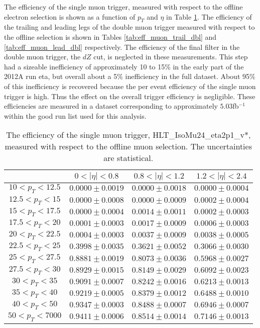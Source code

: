 %
%

The efficiency of the single muon trigger, measured
with respect to the offline electron selection is shown
as a function of $p_T$ and $\eta$ in Table \ref{tab:eff_muon_sgl}.
The efficiency of the trailing and leading legs of the double muon trigger
measured with respect to the offline selection is shown
in Tables \ref{tab:eff_muon_trail_dbl} and \ref{tab:eff_muon_lead_dbl} respectively.
The efficiency of the final filter in the double muon trigger, the $dZ$ cut,
is neglected in these measurements.  This step had a sizeable inefficiency of
approximately 10 to 15\% in the early part of the 2012A run eta, but
overall about a 5\% inefficiency in the full dataset.
About 95\% of this inefficiency is recovered
because the per event efficiency of the single muon trigger is high.
Thus the effect on the overall trigger efficiency is negligible.
These efficiencies are measured in a dataset corresponding
to approximately $5.03$fb$^{-1}$ within the good run list used for this analysis.

\begin{table}[!ht]
\begin{center}
\begin{tabular}{c|c|c|c}
\hline & $0 < |\eta| < 0.8$ & $0.8 < |\eta| < 1.2$ & $1.2 < |\eta| < 2.4$  \\
\hline
$ 10 < p_T < 12.5$ & $0.0000 \pm 0.0019$ & $0.0000 \pm 0.0018$ & $0.0000 \pm 0.0004$  \\
$12.5 < p_T <  15$ & $0.0000 \pm 0.0008$ & $0.0000 \pm 0.0009$ & $0.0002 \pm 0.0004$  \\
$ 15 < p_T < 17.5$ & $0.0000 \pm 0.0004$ & $0.0014 \pm 0.0011$ & $0.0002 \pm 0.0003$  \\
$17.5 < p_T <  20$ & $0.0001 \pm 0.0003$ & $0.0017 \pm 0.0009$ & $0.0006 \pm 0.0003$  \\
$ 20 < p_T < 22.5$ & $0.0004 \pm 0.0003$ & $0.0037 \pm 0.0009$ & $0.0038 \pm 0.0005$  \\
$22.5 < p_T <  25$ & $0.3998 \pm 0.0035$ & $0.3621 \pm 0.0052$ & $0.3066 \pm 0.0030$  \\
$ 25 < p_T < 27.5$ & $0.8881 \pm 0.0019$ & $0.8073 \pm 0.0036$ & $0.5968 \pm 0.0027$  \\
$27.5 < p_T <  30$ & $0.8929 \pm 0.0015$ & $0.8149 \pm 0.0029$ & $0.6092 \pm 0.0023$  \\
$ 30 < p_T <  35$ & $0.9091 \pm 0.0007$ & $0.8242 \pm 0.0016$ & $0.6213 \pm 0.0013$  \\
$ 35 < p_T <  40$ & $0.9219 \pm 0.0005$ & $0.8379 \pm 0.0012$ & $0.6488 \pm 0.0010$  \\
$ 40 < p_T <  50$ & $0.9347 \pm 0.0003$ & $0.8488 \pm 0.0007$ & $0.6946 \pm 0.0007$  \\
$ 50 < p_T < 7000$ & $0.9411 \pm 0.0006$ & $0.8514 \pm 0.0014$ & $0.7146 \pm 0.0013$  \\
\hline
\end{tabular}
\caption{The efficiency of the single muon trigger,
HLT\_IsoMu24\_eta2p1\_v*,
measured with respect to the offline muon selection. 
The uncertainties are statistical.}
\label{tab:eff_muon_sgl}
\end{center}
\end{table}


